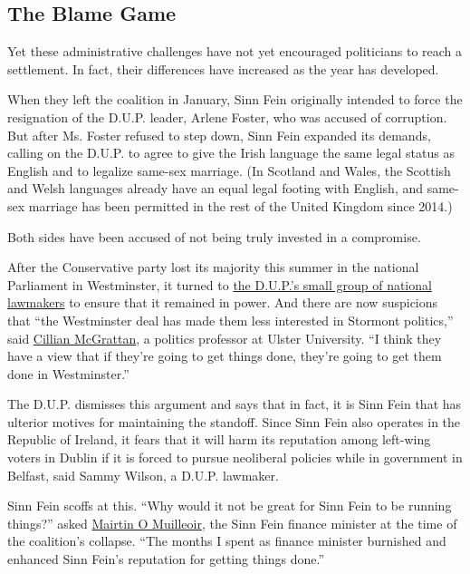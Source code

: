 \hypertarget{the-blame-game}{%
\subsection{The Blame Game}\label{the-blame-game}}

Yet these administrative challenges have not yet encouraged politicians
to reach a settlement. In fact, their differences have increased as the
year has developed.

When they left the coalition in January, Sinn Fein originally intended
to force the resignation of the D.U.P. leader, Arlene Foster, who was
accused of corruption. But after Ms. Foster refused to step down, Sinn
Fein expanded its demands, calling on the D.U.P. to agree to give the
Irish language the same legal status as English and to legalize same-sex
marriage. (In Scotland and Wales, the Scottish and Welsh languages
already have an equal legal footing with English, and same-sex marriage
has been permitted in the rest of the United Kingdom since 2014.)

Both sides have been accused of not being truly invested in a
compromise.

After the Conservative party lost its majority this summer in the
national Parliament in Westminster, it turned to
\href{https://www.nytimes.com/2017/06/10/world/europe/britain-election-dup-northern-ireland.html}{the
D.U.P.'s small group of national lawmakers} to ensure that it remained
in power. And there are now suspicions that ``the Westminster deal has
made them less interested in Stormont politics,'' said
\href{https://www.ulster.ac.uk/staff/cp-mcgrattan}{Cillian McGrattan}, a
politics professor at Ulster University. ``I think they have a view that
if they're going to get things done, they're going to get them done in
Westminster.''

The D.U.P. dismisses this argument and says that in fact, it is Sinn
Fein that has ulterior motives for maintaining the standoff. Since Sinn
Fein also operates in the Republic of Ireland, it fears that it will
harm its reputation among left-wing voters in Dublin if it is forced to
pursue neoliberal policies while in government in Belfast, said Sammy
Wilson, a D.U.P. lawmaker.

Sinn Fein scoffs at this. ``Why would it not be great for Sinn Fein to
be running things?'' asked \href{http://newbelfast.com/}{Mairtin O
Muilleoir}, the Sinn Fein finance minister at the time of the
coalition's collapse. ``The months I spent as finance minister burnished
and enhanced Sinn Fein's reputation for getting things done.''

